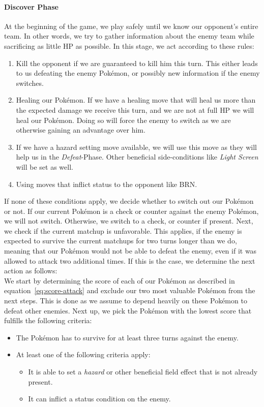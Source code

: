 \paragraph{Discover Phase}
At the beginning of the game, we play safely until we know our opponent's entire team. In other words, we try to gather 
information about the enemy team while sacrificing as little \ac{HP} as possible. In this stage, we act according to
these rules:
\begin{enumerate}
	\item Kill the opponent if we are guaranteed to kill him this turn. This either leads to us defeating the 
	enemy Pokémon, or possibly new information if the enemy switches.
	\item Healing our Pokémon. If we have a healing move that will heal us more than the expected damage we receive
	this turn, and we are not at full \ac{HP} we will heal our Pokémon. Doing so will force the enemy to switch as
	we are otherwise gaining an advantage over him.
	\item If we have a hazard setting move available, we will use this move as they will help us in the \textit{Defeat}-Phase.
	Other beneficial side-conditions like \textit{Light Screen} will be set as well. 
	\item Using moves that inflict status to the opponent like \ac{BRN}.
\end{enumerate}
If none of these conditions apply, we decide whether to switch out our Pokémon or not. If our current Pokémon is a 
check or counter against the enemy Pokémon, we will not switch. Otherwise, we switch to a check,
or counter if present. Next, we check if the current matchup is unfavorable. This applies, if the enemy
is expected to survive the current matchups for two turns longer than we do, meaning that our Pokémon would not be able
to defeat the enemy, even if it was allowed to attack two additional times. If this is the case, we determine the next action
as follows: \\
We start by determining the score of each of our Pokémon as described in equation~\ref{eq:score-attack} and exclude our
two most valuable Pokémon from the next steps. This is done as we assume to depend heavily on these Pokémon to defeat
other enemies. Next up, we pick the Pokémon with the lowest score that fulfills the following 
criteria:
\begin{itemize}
	\item The Pokémon has to survive for at least three turns against the enemy.
	\item At least one of the following criteria apply:
	\begin{itemize}
		\item It is able to set a \textit{hazard} or other beneficial field effect that is not already present.
		\item It can inflict a status condition on the enemy.
	\end{itemize}
\end{itemize}

